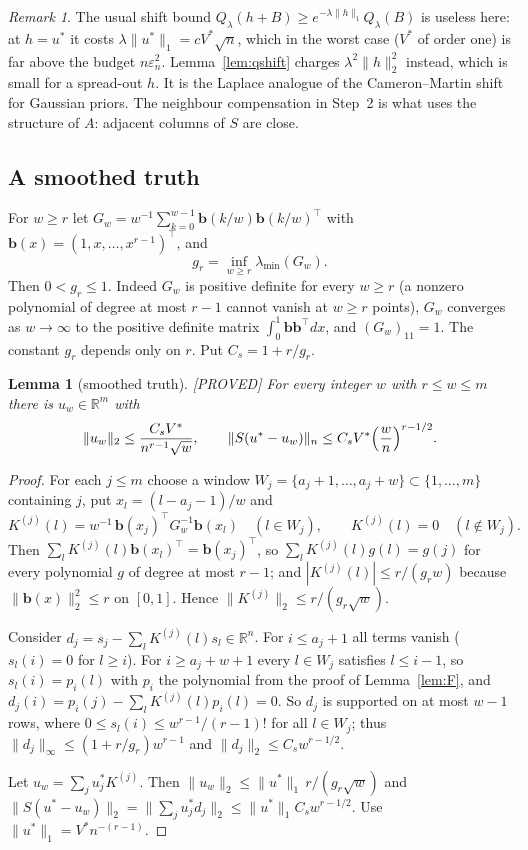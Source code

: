 \documentclass[11pt]{article}
\newtheorem{lemma}{Lemma}
\theoremstyle{definition}
\theoremstyle{remark}
\newtheorem{remark}{Remark}
\newcommand{\R}{\mathbb{R}}
\newcommand{\en}{\varepsilon_n}
\newcommand{\Ql}{Q_\lambda}
\newcommand{\nn}[1]{\|#1\|_n}
\newcommand{\proved}{\textup{[PROVED]}}
\begin{document}
\begin{remark}
The usual shift bound $\Ql(h+B)\ge e^{-\lambda\|h\|_1}\Ql(B)$ is useless here: at $h=u^{*}$ it costs $\lambda\|u^{*}\|_1=cV^{*}\sqrt n$, which in the worst case ($V^{*}$ of order one) is far above the budget $n\en^2$. Lemma~\ref{lem:qshift} charges $\lambda^2\|h\|_2^2$ instead, which is small for a spread-out $h$. It is the Laplace analogue of the Cameron--Martin shift for Gaussian priors. The neighbour compensation in Step~2 is what uses the structure of $A$: adjacent columns of $S$ are close.
\end{remark}

\subsection{A smoothed truth}

For $w\ge r$ let $G_w=w^{-1}\sum_{k=0}^{w-1}\mathbf b(k/w)\mathbf b(k/w)^\top$ with $\mathbf b(x)=(1,x,\dots,x^{r-1})^\top$, and
\[
g_r=\inf_{w\ge r}\lambda_{\min}(G_w).
\]
Then $0<g_r\le1$. Indeed $G_w$ is positive definite for every $w\ge r$ (a nonzero polynomial of degree at most $r-1$ cannot vanish at $w\ge r$ points), $G_w$ converges as $w\to\infty$ to the positive definite matrix $\int_0^1\mathbf b\mathbf b^\top dx$, and $(G_w)_{11}=1$. The constant $g_r$ depends only on $r$. Put $C_s=1+r/g_r$.

\begin{lemma}[smoothed truth]\label{lem:smooth}\proved{}
For every integer $w$ with $r\le w\le m$ there is $u_w\in\R^m$ with
\[
\|u_w\|_2\le\frac{C_sV^{*}}{n^{r-1}\sqrt w},\qquad \nn{S(u^{*}-u_w)}\le C_sV^{*}\Bigl(\frac wn\Bigr)^{r-1/2}.
\]
\end{lemma}

\begin{proof}
For each $j\le m$ choose a window $W_j=\{a_j+1,\dots,a_j+w\}\subset\{1,\dots,m\}$ containing $j$, put $x_l=(l-a_j-1)/w$ and
\[
K^{(j)}(l)=w^{-1}\,\mathbf b(x_j)^\top G_w^{-1}\mathbf b(x_l)\quad(l\in W_j),\qquad K^{(j)}(l)=0\quad(l\notin W_j).
\]
Then $\sum_lK^{(j)}(l)\mathbf b(x_l)^\top=\mathbf b(x_j)^\top$, so $\sum_lK^{(j)}(l)g(l)=g(j)$ for every polynomial $g$ of degree at most $r-1$; and $|K^{(j)}(l)|\le r/(g_rw)$ because $\|\mathbf b(x)\|_2^2\le r$ on $[0,1]$. Hence $\|K^{(j)}\|_2\le r/(g_r\sqrt w)$.

Consider $d_j=s_j-\sum_lK^{(j)}(l)s_l\in\R^n$. For $i\le a_j+1$ all terms vanish ($s_l(i)=0$ for $l\ge i$). For $i\ge a_j+w+1$ every $l\in W_j$ satisfies $l\le i-1$, so $s_l(i)=p_i(l)$ with $p_i$ the polynomial from the proof of Lemma~\ref{lem:F}, and $d_j(i)=p_i(j)-\sum_lK^{(j)}(l)p_i(l)=0$. So $d_j$ is supported on at most $w-1$ rows, where $0\le s_l(i)\le w^{r-1}/(r-1)!$ for all $l\in W_j$; thus $\|d_j\|_\infty\le(1+r/g_r)w^{r-1}$ and $\|d_j\|_2\le C_sw^{r-1/2}$.

Let $u_w=\sum_ju^{*}_jK^{(j)}$. Then $\|u_w\|_2\le\|u^{*}\|_1\,r/(g_r\sqrt w)$ and $\|S(u^{*}-u_w)\|_2=\|\sum_ju^{*}_jd_j\|_2\le\|u^{*}\|_1C_sw^{r-1/2}$. Use $\|u^{*}\|_1=V^{*}n^{-(r-1)}$.
\end{proof}
\end{document}
